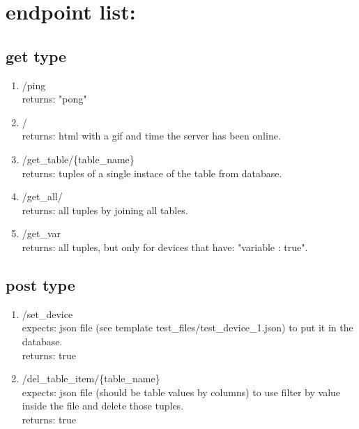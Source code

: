 \documentclass{article}
\begin{document}
\section*{endpoint list:}
\subsection*{get type}
\begin{enumerate}
    \item /ping \\ returns: "pong"
    \item / \\ returns: html with a gif and time the server has been online.
    \item /get\_table/\{table\_name\} \\ returns: tuples of a single instace of the table from database.
    \item /get\_all/ \\ returns: all tuples by joining all tables.
    \item /get\_var \\ returns: all tuples, but only for devices that have: "variable : true".
\end{enumerate}

\subsection*{post type}
\begin{enumerate}
    \item /set\_device \\ expects: json file (see template test\_files/test\_device\_1.json) to put it in the database.\\ returns: true 
    \item /del\_table\_item/\{table\_name\} \\ expects: json file (should be table values by columns) to use filter by value inside the file and delete those tuples.\\ returns: true
\end{enumerate}
\end{document}
